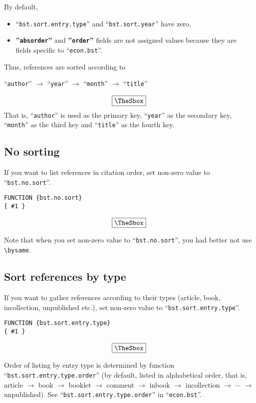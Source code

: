 \documentclass[10pt]{article}
\newenvironment{Frame}%
{\setlength{\fboxsep}{15pt}
\setlength{\mylength}{\linewidth}%
\addtolength{\mylength}{-2\fboxsep}%
\addtolength{\mylength}{-2\fboxrule}%
\Sbox
\minipage{\mylength}%
\setlength{\abovedisplayskip}{0pt}%
\setlength{\belowdisplayskip}{0pt}%
}%
{\endminipage\endSbox
\[\fbox{\TheSbox}\]}
\begin{document}
By default, 
\begin{itemize}
 \item ``\texttt{bst.sort.entry.type}'' and ``\texttt{bst.sort.year}'' have
       zero,
 \item \textbf{''\texttt{absorder}''} and \textbf{''\texttt{order}''}
       fields are not assigned values because they are fields specific
       to ``\texttt{econ.bst}''.
\end{itemize}
Thus, references are sorted according to
\begin{Frame}
 \begin{center}
 ``\texttt{author}'' $\rightarrow$ ``\texttt{year}'' $\rightarrow$
 ``\texttt{month}'' $\rightarrow$  ``\texttt{title}'' 
\end{center}
\end{Frame}
That is, ``\texttt{author}'' is used as the primary key, ``\texttt{year}'' as
the secondary key, ``\texttt{month}'' as the third key and ``\texttt{title}'' as
the fourth key.

\subsection{No sorting}

If you want to list references in citation order, set non-zero value to
``\texttt{bst.no.sort}''.
\begin{Frame}
\begin{verbatim}
FUNCTION {bst.no.sort}
{ #1 }
\end{verbatim}
\end{Frame}

Note that when you set non-zero value to ``\texttt{bst.no.sort}'', you had better not
use \verb|\bysame|.

\subsection{Sort references by type}

If you want to gather references according to their types (article,
book, incollection, unpublished etc.), set non-zero value to
``\texttt{bst.sort.entry.type}''.
\begin{Frame}
\begin{verbatim}
FUNCTION {bst.sort.entry.type}
{ #1 }
\end{verbatim}
\end{Frame}

Order of listing by entry type is determined by function
``\texttt{bst.sort.entry.type.order}'' (by default, listed in alphabetical
order, that is, article $\rightarrow$ book $\rightarrow$ booklet
$\rightarrow$ comment $\rightarrow$ inbook $\rightarrow$ incollection
$\rightarrow$ $\cdots$ $\rightarrow$ unpublished).  See
``\texttt{bst.sort.entry.type.order}'' in ``\texttt{econ.bst}''.
\end{document}
